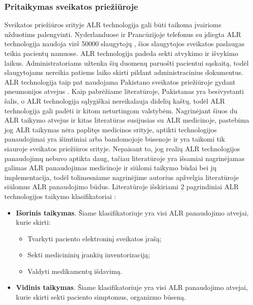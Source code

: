 \subsubsection{Pritaikymas sveikatos priežiūroje}
Sveikatos priežiūros srityje ALR technologija gali būti taikoma įvairioms užduotims palengvinti. Nyderlanduose ir Prancūzijoje telefonus su įdiegta ALR technologija naudoja virš 50000 slaugytojų \cite{ShyamThangaraju2013}, šios slaugytojos sveikatos paslaugas teikia pacientų namuose. ALR technologija padeda sekti atvykimo ir išvykimo laikus. Administratoriams užtenka šių duomenų paruošti pacientui sąskaitą, todėl slaugytojams nereikia patiems laiko skirti pildant administracinius dokumentus. ALR technologija taip pat naudojama Pakistano sveikatos priežiūroje gydant pneumonijos atvejus \cite{Marcus}. Kaip pabrėžiame literatūroje, Pakistanas yra besivystanti šalis, o ALR technologija sąlygiškai nereikalauja didelių kaštų, todėl ALR technologija gali padėti ir kitom neturtingom valstybėm. Nagrinėjant šiuos du ALR taikymo atvejus ir kitas literatūras susijusias su ALR medicinoje, pastebima jog ALR taikymas nėra paplitęs medicinos srityje, aptikti technologijos panaudojimai yra išimtiniai arba bandomojoje būsenoje ir yra taikomi tik siauroje sveikatos priežiūros srityje. Nepaisant to, jog realių ALR technologijos panaudojimų nebuvo aptikta daug, tačiau literatūroje yra išsamiai nagrinėjamas galimas ALR panaudojimas medicinoje ir siūlomi taikymo būdai bei jų implementacija, todėl tolimesniame nagrinėjime autorius apžvelgia literatūroje siūlomus ALR panaudojimo būdus. Literatūroje išskiriami 2 pagrindiniai ALR technologijos taikymo klasifikatoriai \cite{Gautam}:
\begin{itemize}
    \item \textbf{Išorinis taikymas}. Šiame klasifikatoriuje yra visi ALR panaudojimo atvejai, kurie skirti:
        \begin{itemize}
            \item Tvarkyti paciento elektroninį sveikatos įrašą;  
            \item Sekti medicininių įrankių inventorizaciją;
            \item Valdyti medikamentų išdavimą.
        \end{itemize}
    \item \textbf{Vidinis taikymas}. Šiame klasifikatoriuje yra visi ALR panaudojimo atvejai, kurie skirti sekti paciento simptomus, organizmo būseną.
\end{itemize}
 
